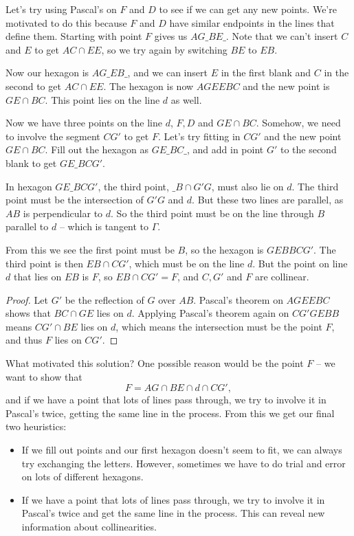 \documentclass[11pt,paper=letter]{scrartcl}
\begin{document}
Let's try using Pascal's on $F$ and $D$ to see if we can get any new points. We're motivated to do this because $F$ and $D$ have similar endpoints in the lines that define them. Starting with point $F$ gives us $AG\_BE\_$. Note that we can't insert $C$ and $E$ to get $AC \cap EE$, so we try again by switching $BE$ to $EB$.

Now our hexagon is $AG\_EB\_$, and we can insert $E$ in the first blank and $C$ in the second to get $AC \cap EE$. The hexagon is now $AGEEBC$ and the new point is $GE \cap BC$. This point lies on the line $d$ as well.

Now we have three points on the line $d$, $F, D$ and $GE \cap BC$. Somehow, we need to involve the segment $CG'$ to get $F$. Let's try fitting in $CG'$ and the new point $GE \cap BC$. Fill out the hexagon as $GE\_BC\_$, and add in point $G'$ to the second blank to get $GE\_BCG'$.

In hexagon $GE\_BCG'$, the third point, $\_B \cap G'G$, must also lie on $d$. The third point must be the intersection of $G'G$ and $d$. But these two lines are parallel, as $AB$ is perpendicular to $d$. So the third point must be on the line through $B$ parallel to $d$ -- which is tangent to $\Gamma$.

From this we see the first point must be $B$, so the hexagon is $GEBBCG'$. The third point is then $EB \cap CG'$, which must be on the line $d$. But the point on line $d$ that lies on $EB$ is $F$, so $EB \cap CG' = F$, and $C, G'$ and $F$ are collinear.

\begin{proof}
  Let $G'$ be the reflection of $G$ over $AB$. Pascal's theorem on $AGEEBC$ shows that $BC \cap GE$ lies on $d$. Applying Pascal's theorem again on $CG'GEBB$ means $CG' \cap BE$ lies on $d$, which means the intersection must be the point $F$, and thus $F$ lies on $CG'$.
\end{proof}

What motivated this solution? One possible reason would be the point $F$ -- we want to show that $$F = AG \cap BE \cap d \cap CG',$$ and if we have a point that lots of lines pass through, we try to involve it in Pascal's twice, getting the same line in the process. From this we get our final two heuristics:

\begin{itemize}
  \item If we fill out points and our first hexagon doesn't seem to fit, we can always try exchanging the letters. However, sometimes we have to do trial and error on lots of different hexagons.

  \item If we have a point that lots of lines pass through, we try to involve it in Pascal's twice and get the same line in the process. This can reveal new information about collinearities.
\end{itemize}
\end{document}
